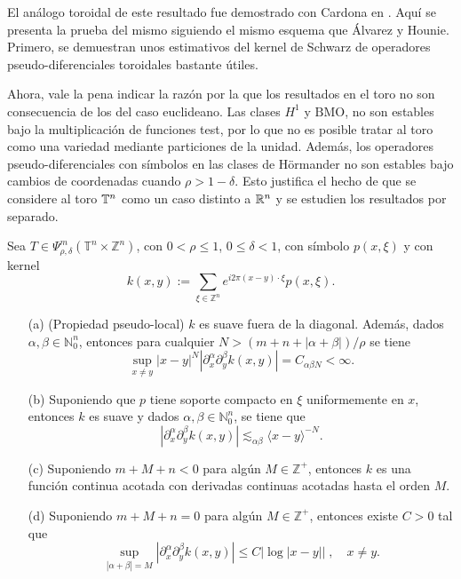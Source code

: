 El análogo toroidal de este resultado fue demostrado con Cardona en 
\cite{Cardona:Martinez}. Aquí se presenta la prueba del mismo siguiendo el mismo esquema que \'Alvarez y Hounie. Primero, se demuestran unos estimativos del kernel de Schwarz de operadores pseudo-diferenciales toroidales bastante útiles.
\begin{remark}
	Ahora, vale la pena indicar la razón por la que los resultados en el toro no son consecuencia de los del caso euclideano. Las clases $H^1$ y $\mathrm{BMO}$, no son estables bajo la multiplicación de funciones test, por lo que no es posible tratar al toro como una variedad mediante particiones de la unidad. Además, los operadores pseudo-diferenciales con símbolos en las clases de Hörmander no son estables bajo cambios de coordenadas cuando $\rho>1-\delta$. Esto justifica el hecho de que se considere al toro $\mathbb{T}^n$ como un caso distinto a $\mathbb{R}^n$ y se estudien los resultados por separado.
\end{remark}
\begin{theorem}
	Sea $T \in \Psi^m_{\rho, \delta}(\mathbb{T}^n \times \mathbb{Z}^n) $, con $0 < \rho \leq 1$, $0 \leq \delta < 1$, con símbolo $p(x, \xi)$ y con kernel
	\begin{equation}
		k(x, y) := \sum_{\xi \in \mathbb{Z}^n} e^{i2\pi(x - y) \cdot \xi} p(x, \xi).
	\end{equation}
	\begin{enumerate}
		\item[(a)] (Propiedad pseudo-local) $k$ es suave fuera de la diagonal. Además, dados $\alpha, \beta \in \mathbb{N}^n_0$, entonces para cualquier $N > (m + n + |\alpha + \beta|)/\rho$ se tiene
		\begin{equation}
			\sup_{x \neq y} |x - y|^N |\partial^\alpha_x \partial^\beta_y k(x, y)| = C_{\alpha\beta N} < \infty.
			\label{eq:teo3-1a}
		\end{equation}
		\item[(b)] Suponiendo que $p$ tiene soporte compacto en $\xi$ uniformemente en $x$, entonces $k$ es suave y dados $\alpha, \beta \in \mathbb{N}^n_0$, se tiene que 
		\begin{equation}
			|\partial^\alpha_x \partial^\beta_y k(x, y)| \lesssim_{\alpha\beta} \langle x - y \rangle^{-N}.
		\end{equation}
		\item[(c)] Suponiendo $m + M + n < 0$ para algún $M \in \mathbb{Z}^+$, entonces $k$ es una función continua acotada con derivadas continuas acotadas hasta el orden $M$.\\
		\item[(d)] Suponiendo $m + M + n = 0$ para algún $M \in \mathbb{Z}^+$, entonces existe $ C >0$ tal que 
		\begin{equation}
			\sup_{|\alpha + \beta| = M} |\partial^\alpha_x \partial^\beta_y k(x, y)| \leq C | \log |x-y| | \; , \quad x \neq y.
		\end{equation} 
	\end{enumerate}
\end{theorem}
